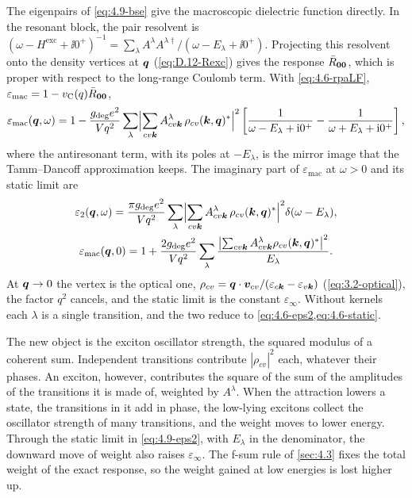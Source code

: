 The eigenpairs of \cref{eq:4.9-bse} give the macroscopic dielectric function directly. In the resonant block, the pair resolvent is $(\omega - H^{\mathrm{exc}} + \ii0^+)^{-1} = \sum_\lambda A^\lambda A^{\lambda\dagger}/(\omega - E_\lambda + \ii0^+)$. Projecting this resolvent onto the density vertices at $\bm{q}$ (\cref{eq:D.12-Rexc}) gives the response $\bar R_{\bm{0}\bm{0}}$, which is proper with respect to the long-range Coulomb term. With \cref{eq:4.6-rpaLF}, $\varepsilon_{\mathrm{mac}} = 1 - v_{\mathrm{C}}(q)\bar R_{\bm{0}\bm{0}}$,
\begin{equation}
  \varepsilon_{\mathrm{mac}}(\bm{q},\omega) = 1 - \frac{g_{\mathrm{deg}}e^2}{Vq^2}\sum_\lambda\Bigl|\sum_{cv\bm{k}}A^\lambda_{cv\bm{k}}\,\rho_{cv}(\bm{k},\bm{q})^*\Bigr|^2
  \left[\frac{1}{\omega - E_\lambda + \mathrm{i}0^+} - \frac{1}{\omega + E_\lambda + \mathrm{i}0^+}\right] ,
  \label{eq:4.9-epsmac}
\end{equation}
where the antiresonant term, with its poles at $-E_\lambda$, is the mirror image that the Tamm--Dancoff approximation keeps. The imaginary part of $\varepsilon_{\mathrm{mac}}$ at $\omega > 0$ and its static limit are
\begin{equation}
  \begin{gathered}
  \varepsilon_2(\bm{q},\omega) = \frac{\pi g_{\mathrm{deg}}e^2}{Vq^2}\sum_\lambda\Bigl|\sum_{cv\bm{k}}A^\lambda_{cv\bm{k}}\,\rho_{cv}(\bm{k},\bm{q})^*\Bigr|^2\delta(\omega - E_\lambda), \\
  \varepsilon_{\mathrm{mac}}(\bm{q},0) = 1 + \frac{2g_{\mathrm{deg}}e^2}{Vq^2}\sum_\lambda\frac{\bigl|\sum_{cv\bm{k}}A^\lambda_{cv\bm{k}}\rho_{cv}(\bm{k},\bm{q})^*\bigr|^2}{E_\lambda} .
  \end{gathered}
  \label{eq:4.9-eps2}
\end{equation}
At $\bm{q} \to 0$ the vertex is the optical one, $\rho_{cv} = \bm{q}\cdot\bm{v}_{cv}/(\varepsilon_{c\bm{k}} - \varepsilon_{v\bm{k}})$ (\cref{eq:3.2-optical}), the factor $q^2$ cancels, and the static limit is the constant $\varepsilon_\infty$. Without kernels each $\lambda$ is a single transition, and the two reduce to \cref{eq:4.6-eps2,eq:4.6-static}.

The new object is the exciton oscillator strength, the squared modulus of a coherent sum. Independent transitions contribute $|\rho_{cv}|^2$ each, whatever their phases. An exciton, however, contributes the square of the sum of the amplitudes of the transitions it is made of, weighted by $A^\lambda$. When the attraction lowers a state, the transitions in it add in phase, the low-lying excitons collect the oscillator strength of many transitions, and the weight moves to lower energy. Through the static limit in \cref{eq:4.9-eps2}, with $E_\lambda$ in the denominator, the downward move of weight also raises $\varepsilon_\infty$. The f-sum rule of \cref{sec:4.3} fixes the total weight of the exact response, so the weight gained at low energies is lost higher up.

